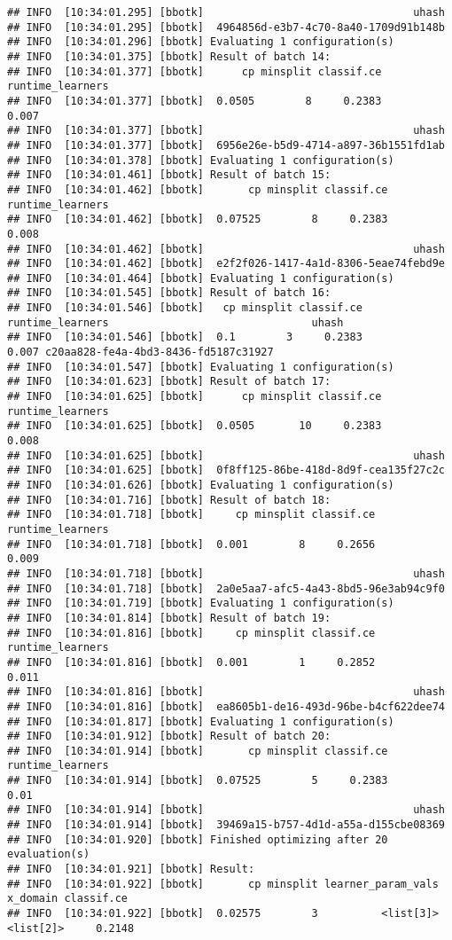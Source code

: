 \documentclass[
]{scrbook}
\begin{document}
\begin{verbatim}
## INFO  [10:34:01.295] [bbotk]                                 uhash 
## INFO  [10:34:01.295] [bbotk]  4964856d-e3b7-4c70-8a40-1709d91b148b 
## INFO  [10:34:01.296] [bbotk] Evaluating 1 configuration(s) 
## INFO  [10:34:01.375] [bbotk] Result of batch 14: 
## INFO  [10:34:01.377] [bbotk]      cp minsplit classif.ce runtime_learners 
## INFO  [10:34:01.377] [bbotk]  0.0505        8     0.2383            0.007 
## INFO  [10:34:01.377] [bbotk]                                 uhash 
## INFO  [10:34:01.377] [bbotk]  6956e26e-b5d9-4714-a897-36b1551fd1ab 
## INFO  [10:34:01.378] [bbotk] Evaluating 1 configuration(s) 
## INFO  [10:34:01.461] [bbotk] Result of batch 15: 
## INFO  [10:34:01.462] [bbotk]       cp minsplit classif.ce runtime_learners 
## INFO  [10:34:01.462] [bbotk]  0.07525        8     0.2383            0.008 
## INFO  [10:34:01.462] [bbotk]                                 uhash 
## INFO  [10:34:01.462] [bbotk]  e2f2f026-1417-4a1d-8306-5eae74febd9e 
## INFO  [10:34:01.464] [bbotk] Evaluating 1 configuration(s) 
## INFO  [10:34:01.545] [bbotk] Result of batch 16: 
## INFO  [10:34:01.546] [bbotk]   cp minsplit classif.ce runtime_learners                                uhash 
## INFO  [10:34:01.546] [bbotk]  0.1        3     0.2383            0.007 c20aa828-fe4a-4bd3-8436-fd5187c31927 
## INFO  [10:34:01.547] [bbotk] Evaluating 1 configuration(s) 
## INFO  [10:34:01.623] [bbotk] Result of batch 17: 
## INFO  [10:34:01.625] [bbotk]      cp minsplit classif.ce runtime_learners 
## INFO  [10:34:01.625] [bbotk]  0.0505       10     0.2383            0.008 
## INFO  [10:34:01.625] [bbotk]                                 uhash 
## INFO  [10:34:01.625] [bbotk]  0f8ff125-86be-418d-8d9f-cea135f27c2c 
## INFO  [10:34:01.626] [bbotk] Evaluating 1 configuration(s) 
## INFO  [10:34:01.716] [bbotk] Result of batch 18: 
## INFO  [10:34:01.718] [bbotk]     cp minsplit classif.ce runtime_learners 
## INFO  [10:34:01.718] [bbotk]  0.001        8     0.2656            0.009 
## INFO  [10:34:01.718] [bbotk]                                 uhash 
## INFO  [10:34:01.718] [bbotk]  2a0e5aa7-afc5-4a43-8bd5-96e3ab94c9f0 
## INFO  [10:34:01.719] [bbotk] Evaluating 1 configuration(s) 
## INFO  [10:34:01.814] [bbotk] Result of batch 19: 
## INFO  [10:34:01.816] [bbotk]     cp minsplit classif.ce runtime_learners 
## INFO  [10:34:01.816] [bbotk]  0.001        1     0.2852            0.011 
## INFO  [10:34:01.816] [bbotk]                                 uhash 
## INFO  [10:34:01.816] [bbotk]  ea8605b1-de16-493d-96be-b4cf622dee74 
## INFO  [10:34:01.817] [bbotk] Evaluating 1 configuration(s) 
## INFO  [10:34:01.912] [bbotk] Result of batch 20: 
## INFO  [10:34:01.914] [bbotk]       cp minsplit classif.ce runtime_learners 
## INFO  [10:34:01.914] [bbotk]  0.07525        5     0.2383             0.01 
## INFO  [10:34:01.914] [bbotk]                                 uhash 
## INFO  [10:34:01.914] [bbotk]  39469a15-b757-4d1d-a55a-d155cbe08369 
## INFO  [10:34:01.920] [bbotk] Finished optimizing after 20 evaluation(s) 
## INFO  [10:34:01.921] [bbotk] Result: 
## INFO  [10:34:01.922] [bbotk]       cp minsplit learner_param_vals  x_domain classif.ce 
## INFO  [10:34:01.922] [bbotk]  0.02575        3          <list[3]> <list[2]>     0.2148
\end{verbatim}
\end{document}
